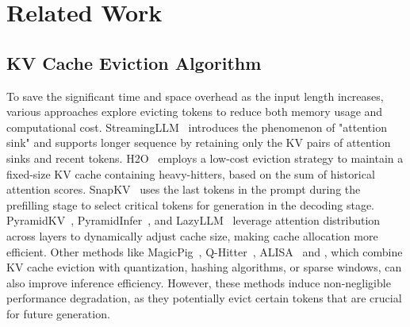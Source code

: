 \section{Related Work}
\subsection{KV Cache Eviction Algorithm}

To save the significant time and space overhead as the input length increases, various approaches explore evicting tokens to reduce both memory usage and computational cost. StreamingLLM~\cite{streamingllm} introduces the phenomenon of "attention sink" and supports longer sequence by retaining only the KV pairs of attention sinks and recent tokens. H2O~\cite{h2o} employs a low-cost eviction strategy to maintain a fixed-size KV cache containing heavy-hitters, based on the sum of historical attention scores. SnapKV~\cite{snapkv} uses the last tokens in the prompt during the prefilling stage to select critical tokens for generation in the decoding stage. PyramidKV~\cite{pyramidkv}, PyramidInfer~\cite{pyramidinfer}, and LazyLLM~\cite{lazyllm} leverage attention distribution across layers to dynamically adjust cache size, 
making cache allocation more efficient. 
Other methods like MagicPig~\cite{magicpig}, Q-Hitter~\cite{q-hitter}, ALISA~\cite{alisa} and , which combine KV cache eviction with quantization, hashing algorithms, or sparse windows, can also improve inference efficiency.
However, these methods induce non-negligible performance degradation, as they potentially evict certain tokens that are crucial for future generation.

